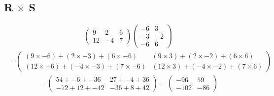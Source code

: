 \documentclass[a4paper,10pt]{article}
\begin{document}
      \newpage

      \subsection{R $\times$ S}
        \begin{align*}
          \begin{pmatrix}
            9 & 2 & 6\\
            12 & -4 & 7
          \end{pmatrix}
          \begin{pmatrix}
            -6 & 3\\
            -3 & -2\\
            -6 & 6
          \end{pmatrix}
        \end{align*}
        \begin{align*}
          =
          \begin{pmatrix}
            ( 9 \times -6) + ( 2 \times -3) + (6 \times -6) & ( 9 \times 3) + ( 2 \times -2) + (6 \times 6)\\
            (12 \times -6) + (-4 \times -3) + (7 \times -6) & (12 \times 3) + (-4 \times -2) + (7 \times 6)
          \end{pmatrix}
        \end{align*}
        \begin{align*}
          =
          \begin{pmatrix}
             54 + -6 + -36 &  27 + -4 + 36\\
            -72 + 12 + -42 & -36 +  8 + 42
          \end{pmatrix}
          =
          \begin{pmatrix}
             -96 & 59\\
            -102 & -86
          \end{pmatrix}
        \end{align*}
\end{document}
